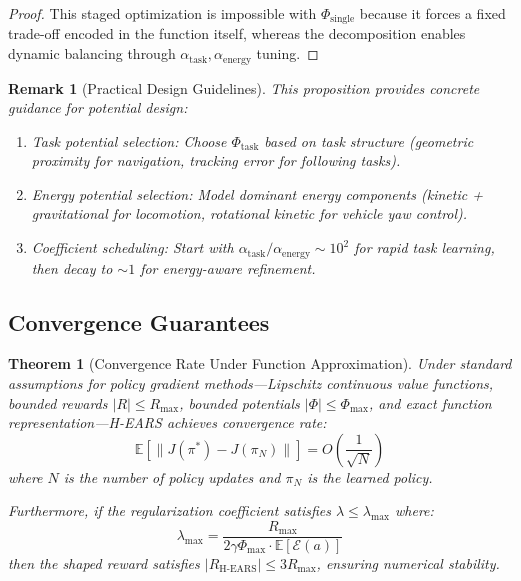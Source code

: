 \documentclass[journal]{IEEEtran}
\newtheorem{theorem}{Theorem}[section]
\newtheorem*{remark}{Remark}
\begin{document}
\begin{proof}
		This staged optimization is impossible with $\Phi_{\text{single}}$ because it forces a fixed trade-off encoded in the function itself, whereas the decomposition enables dynamic balancing through $\alpha_{\text{task}}, \alpha_{\text{energy}}$ tuning.
	\end{proof}
	
	\begin{remark}[Practical Design Guidelines]
		This proposition provides concrete guidance for potential design:
		\begin{enumerate}
			\item Task potential selection: Choose $\Phi_{\text{task}}$ based on task structure (geometric proximity for navigation, tracking error for following tasks).
			\item Energy potential selection: Model dominant energy components (kinetic + gravitational for locomotion, rotational kinetic for vehicle yaw control).
			\item Coefficient scheduling: Start with $\alpha_{\text{task}}/\alpha_{\text{energy}} \sim 10^2$ for rapid task learning, then decay to $\sim 1$ for energy-aware refinement.
		\end{enumerate}
	\end{remark}
	
	\subsection{Convergence Guarantees}
	
	\begin{theorem}[Convergence Rate Under Function Approximation]
		\label{thm:convergence}
		Under standard assumptions for policy gradient methods---Lipschitz continuous value functions, bounded rewards $|R|\leq R_{\max}$, bounded potentials $|\Phi|\leq\Phi_{\max}$, and exact function representation---H-EARS achieves convergence rate:
		\begin{equation}
			\mathbb{E}\left[\|J(\pi^*) - J(\pi_N)\|\right] = O\left(\frac{1}{\sqrt{N}}\right)
		\end{equation}
		where $N$ is the number of policy updates and $\pi_N$ is the learned policy.
		
		Furthermore, if the regularization coefficient satisfies $\lambda \leq \lambda_{\max}$ where:
		\begin{equation}
			\lambda_{\max} = \frac{R_{\max}}{2\gamma\Phi_{\max}\cdot\mathbb{E}[\mathcal{E}(a)]}
			\label{eq:lambda_bound}
		\end{equation}
		then the shaped reward satisfies $|R_{\text{H-EARS}}| \leq 3R_{\max}$, ensuring numerical stability.
	\end{theorem}
	
\end{document}
